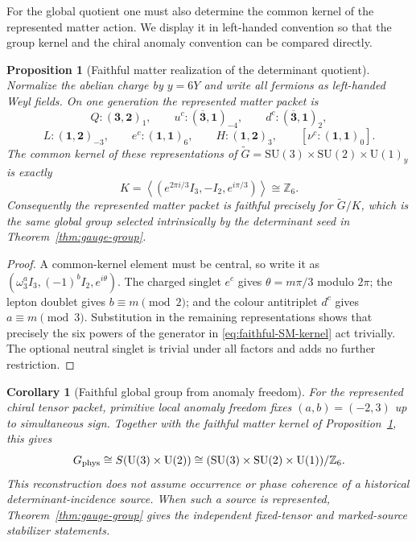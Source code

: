 \documentclass[11pt]{article}
\numberwithin{equation}{section}
\newtheorem{proposition}[theorem]{Proposition}
\newtheorem{corollary}[theorem]{Corollary}
\theoremstyle{definition}
\theoremstyle{remark}
\newcommand{\Z}{\mathbb Z}
\newcommand{\U}{\mathrm U}
\newcommand{\SU}{\mathrm{SU}}
\begin{document}
For the global quotient one must also determine the common kernel of the
represented matter action.  We display it in left-handed convention so
that the group kernel and the chiral anomaly convention can be compared
directly.

\begin{proposition}[Faithful matter realization of the determinant quotient]
\label{prop:faithful-SM-quotient}
Normalize the abelian charge by $y=6Y$ and write all fermions as left-handed
Weyl fields.  On one generation the represented matter packet is
\[
Q:(\mathbf3,\mathbf2)_1,
\qquad
u^c:(\overline{\mathbf3},\mathbf1)_{-4},
\qquad
d^c:(\overline{\mathbf3},\mathbf1)_2,
\]
\[
L:(\mathbf1,\mathbf2)_{-3},
\qquad
e^c:(\mathbf1,\mathbf1)_6,
\qquad
H:(\mathbf1,\mathbf2)_3,
\qquad
[\nu^c:(\mathbf1,\mathbf1)_0].
\]
The common kernel of these representations of
$\widetilde G=\SU(3)\times\SU(2)\times\U(1)_y$ is exactly
\begin{equation}
K
=
\left\langle
\left(e^{2\pi i/3}I_3,-I_2,e^{i\pi/3}\right)
\right\rangle
\cong\Z_6.
\label{eq:faithful-SM-kernel}
\end{equation}
Consequently the represented matter packet is faithful precisely for
$\widetilde G/K$, which is the same global group selected intrinsically by the
determinant seed in Theorem~\ref{thm:gauge-group}.
\end{proposition}

\begin{proof}
A common-kernel element must be central, so write it as
$(\omega_3^aI_3,(-1)^bI_2,e^{i\theta})$.  The charged singlet $e^c$ gives
$\theta=m\pi/3$ modulo $2\pi$; the lepton doublet gives
$b\equiv m\pmod2$; and the colour antitriplet $d^c$ gives
$a\equiv m\pmod3$.  Substitution in the remaining representations shows that
precisely the six powers of the generator in
\eqref{eq:faithful-SM-kernel} act trivially.  The optional neutral singlet is
trivial under all factors and adds no further restriction.
\end{proof}

\begin{corollary}[Faithful global group from anomaly freedom]
\label{cor:anomaly-faithful-group}
For the represented chiral tensor packet, primitive local anomaly freedom fixes
$(a,b)=(-2,3)$ up to simultaneous sign.  Together with the faithful matter
kernel of Proposition~\ref{prop:faithful-SM-quotient}, this gives
\[
 G_{\rm phys}\cong
 S(\U(3)\times\U(2))
 \cong
 (\SU(3)\times\SU(2)\times\U(1))/\Z_6.
\]
This reconstruction does not assume occurrence or phase coherence of a
historical determinant-incidence source.  When such a source is represented,
Theorem~\ref{thm:gauge-group} gives the independent
fixed-tensor and marked-source stabilizer statements.
\end{corollary}
\end{document}
